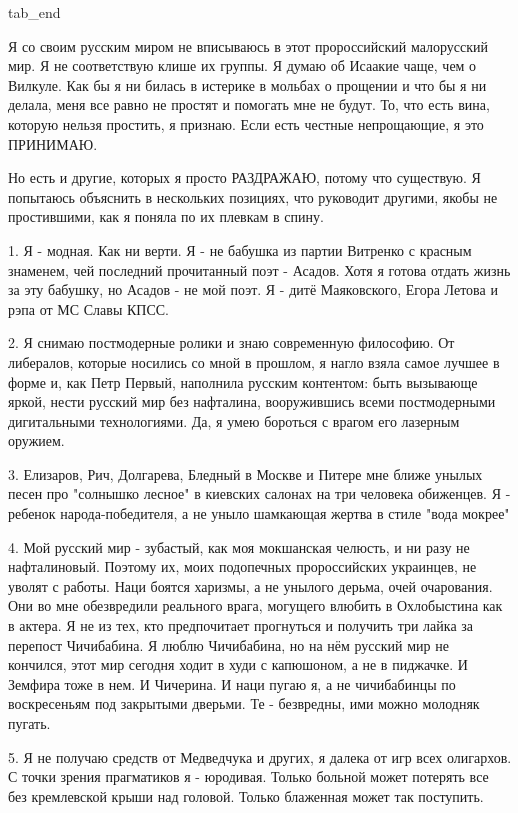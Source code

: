   tab_end
\fi

Я со своим русским миром не вписываюсь в этот пророссийский малорусский мир. Я
не соответствую клише их группы. Я думаю об Исаакие чаще, чем о Вилкуле. Как бы
я ни билась в истерике в мольбах о прощении и что бы я ни делала, меня все
равно не простят и помогать мне не будут. То, что есть вина, которую нельзя
простить, я признаю. Если есть честные непрощающие, я это ПРИНИМАЮ. 

Но есть и другие, которых я просто РАЗДРАЖАЮ, потому что существую. Я попытаюсь
объяснить в нескольких позициях, что руководит другими, якобы не простившими,
как я поняла по их плевкам в спину.

1. Я - модная. Как ни верти. Я - не бабушка из партии Витренко с красным
знаменем, чей последний прочитанный поэт - Асадов. Хотя я готова отдать жизнь
за эту бабушку, но Асадов - не мой поэт. Я - дитё Маяковского, Егора Летова и
рэпа от  МС Славы КПСС.

2. Я снимаю постмодерные ролики и знаю современную философию. От либералов,
которые носились со мной в прошлом, я нагло взяла самое лучшее в форме и, как
Петр Первый, наполнила русским контентом: быть вызывающе яркой, нести русский
мир без нафталина, вооружившись всеми постмодерными дигитальными технологиями.
Да, я умею бороться с врагом его лазерным оружием.

3. Елизаров, Рич, Долгарева, Бледный в Москве и Питере мне ближе унылых песен
про "солнышко лесное" в киевских салонах на три человека обиженцев.  Я -
ребенок народа-победителя, а не уныло шамкающая жертва в стиле "вода мокрее" 

4. Мой русский мир - зубастый, как моя мокшанская челюсть, и ни разу не
нафталиновый. Поэтому их, моих подопечных пророссийских украинцев, не уволят с
работы. Наци боятся харизмы, а не унылого дерьма, очей очарования. Они во мне
обезвредили реального врага, могущего влюбить в Охлобыстина как в актера. Я не
из тех, кто предпочитает прогнуться и получить три лайка за перепост
Чичибабина. Я люблю Чичибабина, но на нём русский мир не кончился, этот мир
сегодня ходит в худи с капюшоном, а не в пиджачке. И Земфира тоже в нем. И
Чичерина. И наци пугаю я, а не чичибабинцы по воскресеньям под закрытыми
дверьми. Те - безвредны, ими можно молодняк пугать.

5. Я не получаю средств от Медведчука и других, я далека от игр всех олигархов.
С точки зрения прагматиков я - юродивая. Только больной может потерять все без
кремлевской крыши над головой. Только блаженная может так поступить. 

